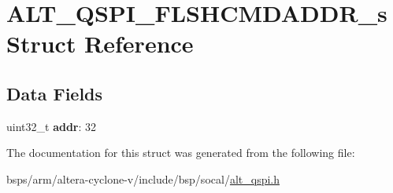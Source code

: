 \hypertarget{structALT__QSPI__FLSHCMDADDR__s}{}\section{A\+L\+T\+\_\+\+Q\+S\+P\+I\+\_\+\+F\+L\+S\+H\+C\+M\+D\+A\+D\+D\+R\+\_\+s Struct Reference}
\label{structALT__QSPI__FLSHCMDADDR__s}
\subsection*{Data Fields}
\begin{DoxyCompactItemize}
\item 
\mbox{\label{structALT__QSPI__FLSHCMDADDR__s_a7040ec0dce313990ff334ee7d7c76672}} 
uint32\+\_\+t {\bfseries addr}\+: 32
\end{DoxyCompactItemize}


The documentation for this struct was generated from the following file\+:\begin{DoxyCompactItemize}
\item 
bsps/arm/altera-\/cyclone-\/v/include/bsp/socal/\mbox{\hyperlink{include_2bsp_2socal_2alt__qspi_8h}{alt\+\_\+qspi.\+h}}\end{DoxyCompactItemize}
